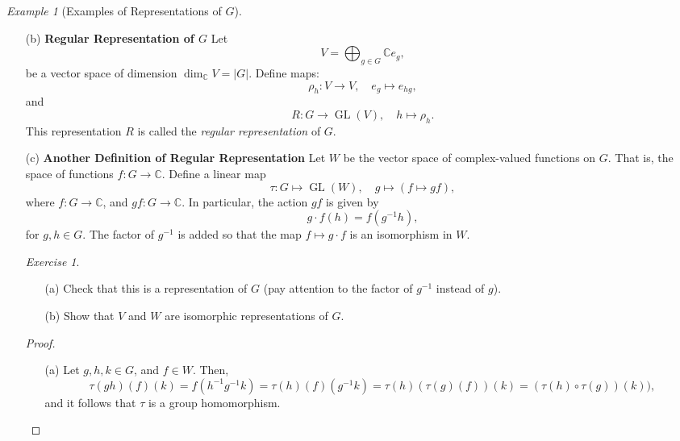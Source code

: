 \documentclass[a4paper]{report}
\theoremstyle{definition}
\theoremstyle{remark}
\theoremstyle{proposition}
\theoremstyle{conjecture}
\theoremstyle{lemma}
\theoremstyle{corollary}
\theoremstyle{exercise}
\newtheorem{exercise}{Exercise}
\theoremstyle{example}
\newtheorem{example}{Example}
\newcommand{\C}{\mathbb{C}}
\newcommand{\on}{\operatorname}
\begin{document}
\begin{example}[Examples of Representations of $G$]
\begin{itemize}
\paragraph{Answer:} Since $\mathbb{Z}/n\mathbb{Z}$ is a cyclic group,
any generator gets mapped to an $n$-th root of unity under $\rho$. There 
are $n$ such elements that we can map to an $n$-root of unity.
\item[(b)] \textbf{Regular Representation of $G$} Let 
    $$V = \bigoplus_{g \in G} \C e_g,$$
        be a vector space of dimension $\dim_\C V =\vert G \vert$.
        Define maps:
        $$\rho_h : V \longrightarrow V, \quad e_g \longmapsto e_{hg},$$
        and $$R : G \longrightarrow \on{GL}(V),\quad h\longmapsto \rho_h.$$
        This representation $R$ is called the \emph{regular representation}
        of $G$. 
    \item[(c)] \textbf{Another Definition of Regular Representation} 
        Let $W$ be the vector space of complex-valued functions on $G$.
        That is, the space of functions $f : G \to \C$. 
        Define a linear map 
        $$\tau : G \longmapsto \on{GL}(W), \quad g \longmapsto (f \longmapsto gf),$$
        where $f: G \to \C$, and $gf: G \to \C$. In particular, the action 
        $gf$ is given by 
        $$g\cdot f(h) = f(g^{-1}h),$$
        for $g,h \in G$. 
        The factor of $g^{-1}$ is added so that the map
        $f \mapsto g\cdot f$ is an isomorphism in $W$. 
        \begin{exercise}
            \leavevmode 
            \begin{itemize}
                \item[(a)] Check that this is a representation of $G$ (pay attention to the factor of $g^{-1}$ instead of $g$).
                \item[(b)] Show that $V$ and $W$ are isomorphic representations 
                    of $G$.
            \end{itemize}
        \end{exercise}
        \begin{proof}
            \leavevmode 
            \begin{itemize}
                \item[(a)] Let $g,h,k\in G$, and $f\in W$. Then,
                    $$\tau(gh)(f)(k) = f(h^{-1}g^{-1}k) = \tau(h)(f)(g^{-1}k) = \tau(h) (\tau(g)(f))(k) = (\tau(h) \circ \tau(g))(k)),$$
                    and it follows that $\tau$ is a group homomorphism. 

\end{itemize}
\end{proof}
\end{itemize}
\end{example}
\end{document}
